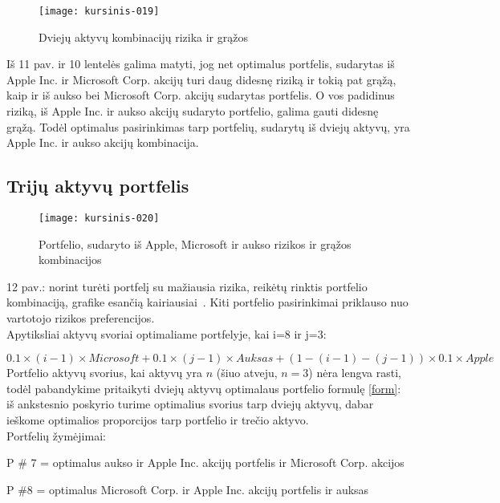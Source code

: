 \documentclass[12pt, a14paper, lithuanian]{article}
\begin{document}
\begin{figure}[H]
  \centering
\texttt{[image: kursinis-019]}
  \caption{Dviejų aktyvų kombinacijų rizika ir grąžos}
\end{figure}  

Iš 11 pav. ir 10 lentelės galima matyti, jog net optimalus portfelis, sudarytas iš Apple Inc. ir Microsoft Corp. akcijų turi daug
didesnę riziką ir tokią pat grąžą, kaip ir iš aukso bei Microsoft Corp. akcijų sudarytas portfelis. O vos padidinus riziką,
iš Apple Inc. ir aukso akcijų sudaryto portfelio, galima gauti didesnę grąžą. Todėl optimalus pasirinkimas
tarp portfelių, sudarytų iš dviejų aktyvų, yra Apple Inc. ir aukso akcijų kombinacija.

           
\subsection{Trijų aktyvų portfelis}
 
\begin{figure}[H]
  \centering
\texttt{[image: kursinis-020]}
  \caption{Portfelio, sudaryto iš Apple, Microsoft ir aukso rizikos ir grąžos kombinacijos}
\end{figure}

12 pav.: norint turėti portfelį su mažiausia rizika, reikėtų rinktis portfelio kombinaciją, grafike esančią kairiausiai~\cite{cope}. Kiti portfelio pasirinkimai priklauso nuo vartotojo rizikos preferencijos. \\

Apytiksliai aktyvų svoriai optimaliame portfelyje, kai i=8 ir j=3:

$ 0.1 \times (i-1) \times Microsoft + 0.1 \times (j-1) \times Auksas + (1 - (i-1) - (j-1)) \times  0.1 \times Apple$ \\



Portfelio aktyvų svorius, kai aktyvų yra $n$ (šiuo atveju, $n=3$) nėra lengva rasti, todėl pabandykime pritaikyti dviejų aktyvų optimalaus portfelio formulę \eqref{form}: iš ankstesnio poskyrio turime optimalius svorius tarp dviejų aktyvų, dabar ieškome optimalios proporcijos tarp portfelio ir trečio aktyvo. \\


Portfelių žymėjimai:

P \# 7 = optimalus aukso ir Apple Inc. akcijų portfelis ir Microsoft Corp. akcijos

P \#8 = optimalus Microsoft Corp. ir Apple Inc. akcijų portfelis ir auksas
\end{document}
